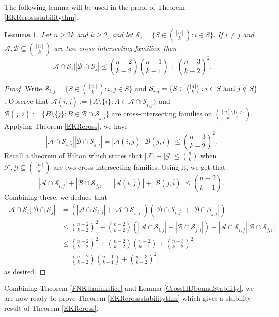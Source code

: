 \documentclass[11pt]{article}
\numberwithin{equation}{section}
\newtheorem{lemma}[theorem]{Lemma}
\def\A{\mathcal{A}}
\def\B{\mathcal{B}}
\def\F{\mathcal{F}}
\def\G{\mathcal{G}}
\begin{document}
The following lemma will be used in the proof of Theorem
\ref{EKRcrossstabilitythm}.


\begin{lemma}\label{crossstarlemma}
Let $n \geq 2k$ and $k\geq 2$, and let $\mathcal{S}_i=\{S\in \binom{[n]}{k}: i\in S\}$.
If $i\neq j$ and $\A,\B\subseteq \binom{[n]}{k}$ are two cross-intersecting families, then
$$|\A\cap \mathcal{S}_i|  |\B\cap \mathcal{S}_j|
\leq \binom{n-2}{k-2}\binom{n-1}{k-1}+\binom{n-3}{k-2}^2.$$
\end{lemma}
\begin{proof}
Write $\mathcal{S}_{i,j}=\{S\in \binom{[n]}{k}: i,j\in S\}$ and $\mathcal{S}_{i,\overline{j}}=
\{S\in \binom{[n]}{k}: i \in S {~\rm and~} j\notin S\}$.
Observe that $\A(i,\overline{j}):=\{A\setminus \{i \} : A\in \A\cap \mathcal{S}_{i,\overline{j}}\}$ and
$\B(j,\overline{i}):=\{B\setminus \{ j\} : B\in \B\cap \mathcal{S}_{j,\overline{i}}\}$ are cross-intersecting families on $\binom{[n]\setminus \{i,j\}}{k-1}$.
Applying Theorem \ref{EKRcross}, we have
$$|\A\cap \mathcal{S}_{i,\overline{j}} |
|\B\cap \mathcal{S}_{j,\overline{i}} |
=|\A(i,\overline{j})|
|\B(j,\overline{i})|
\leq \binom{n-3}{k-2}^2.$$
Recall a theorem of Hilton \cite[Theorem 1]{Hilton} which states that
$|\F|+|\G| \leq \binom{n}{k}$ when $\F,\G\subseteq \binom{[n]}{k}$ are
two cross-intersecting families.
Using it, we get that
$$|\A\cap \mathcal{S}_{i,\overline{j}} | +
|\B\cap \mathcal{S}_{j,\overline{i}} |
=|\A(i,\overline{j})|+|\B(j,\overline{i})|
\leq \binom{n-2}{k-1}.$$
Combining these, we deduce that
\begin{align*}
|\A\cap \mathcal{S}_i|  |\B\cap \mathcal{S}_j|
&=\left(|\A\cap \mathcal{S}_{i,j}|+|\A\cap \mathcal{S}_{i,\overline{j}}|\right) \left(|\B\cap \mathcal{S}_{i,j}|+|\B\cap \mathcal{S}_{j,\overline{i}}|\right) \\
&\leq \binom{n-2}{k-2}^2+ \binom{n-2}{k-2}
\left(|\A\cap \mathcal{S}_{i,\overline{j}} | +
|\B\cap \mathcal{S}_{j,\overline{i}} |\right)
+|\A\cap \mathcal{S}_{i,\overline{j}} |
|\B\cap \mathcal{S}_{j,\overline{i}} |\\
&\leq \binom{n-2}{k-2}^2+\binom{n-2}{k-2}\binom{n-2}{k-1}+ \binom{n-3}{k-2}^2\\
&=\binom{n-2}{k-2}\binom{n-1}{k-1}+\binom{n-3}{k-2}^2,
\end{align*}
as desired.
\end{proof}



Combining Theorem \ref{FNKthninkslice} and Lemma \ref{CrossHDboundStability},
we are now ready to prove Theorem \ref{EKRcrossstabilitythm} which gives
a stability result of Theorem \ref{EKRcross}.
\end{document}
